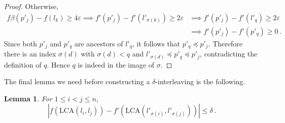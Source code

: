 \documentclass{article}
\newtheorem{lemma}[theorem]{Lemma}
\theoremstyle{definition}
\newcommand{\LCA}{\mathrm{LCA}}
\renewcommand{\epsilon}{\varepsilon}
\begin{document}
\begin{proof}
    Otherwise,
    \begin{align*}
        f\beta(p'_j) - f(l_k) \geq 4\epsilon \implies f'(p'_j) - f'(l'_{\sigma(k)}) \geq 2\epsilon &\implies f'(p'_j) - f'(l'_q) \geq 2\epsilon\\
        &\implies f'(p'_j) - f'(p'_q) \geq 0\,.
    \end{align*}
    Since both $p'_j$ and $p'_q$ are ancestors of $l'_q$, it follows that $p'_q \preceq p'_j$. Therefore there is an index $\sigma(d)$ with $\sigma(d) < q$ and $l'_{\sigma(d)} \preceq p'_q \preceq p'_j$, contradicting the definition of $q$. Hence $q$ is indeed in the image of $\sigma$.
\end{proof}

The final lemma we need before constructing a $\delta$-interleaving is the following.

\begin{lemma}
    \label{lem:lca}
    For $1 \leq i < j \leq n$,
    \begin{equation*}
        |f(\LCA(l_i,l_j)) - f'(\LCA(l'_{\sigma(i)}, l'_{\sigma(j)}))| \leq \delta\,.
    \end{equation*}
\end{lemma}
\end{document}
